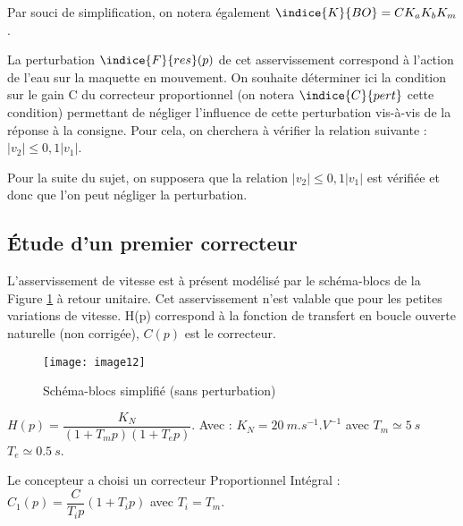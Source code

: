 Par souci de simplification, on notera également $\indice{K}{BO}=CK_a K_b K_m$.


La perturbation $\indice{F}{res}(p)$ de cet asservissement correspond à l'action de l'eau sur la maquette en mouvement. On souhaite déterminer ici la condition sur le gain C du correcteur proportionnel (on notera $\indice{C}{pert}$ cette condition) permettant de négliger l'influence de cette perturbation vis-à-vis de la réponse à la consigne. Pour cela, on cherchera à vérifier la relation suivante : $|v_2 | \leq 0,1 |v_1 |$.


Pour la suite du sujet, on supposera que la relation $|v_2 | \leq 0,1 |v_1 |$ est vérifiée et donc que l'on peut négliger la perturbation.

\subsection{Étude d'un premier correcteur}

L'asservissement de vitesse est à présent modélisé par le schéma-blocs de la Figure \ref{fig:CCMP:2021:12} à retour unitaire. Cet asservissement n’est valable que pour les petites variations de vitesse.
H(p) correspond à la fonction de transfert en boucle ouverte naturelle (non corrigée), $C(p)$ est le correcteur.
 
\begin{figure}[!h]
\centering
\texttt{[image: image12]}
\caption{\label{fig:CCMP:2021:12} Schéma-blocs simplifié (sans perturbation)}
\end{figure}  

$H(p)=\dfrac{K_N}{\left(1+T_m p\right) \left(1+T_e p\right)}$. 
Avec : $K_N=\SI{20}{m.s^{-1}.V^{-1}}$ avec $T_m\simeq \SI{5}{s}$	$T_e\simeq\SI{0,5}{s}$.
 

Le concepteur a choisi un correcteur Proportionnel Intégral :	$C_1 (p)=\dfrac{C}{T_i p} \left(1+T_i p\right)$ avec $T_i=T_m$.

